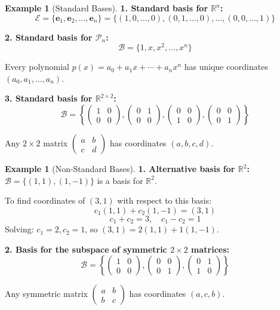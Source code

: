 \documentclass[12pt]{article}
\numberwithin{equation}{section}
\newcommand{\vect}[1]{\boldsymbol{#1}}   %
\theoremstyle{plain}
\theoremstyle{definition}
\newtheorem{example}[theorem]{Example}
\theoremstyle{remark}
\begin{document}
\begin{example}[Standard Bases]
\textbf{1. Standard basis for $\mathbb{R}^n$:}
$$\mathcal{E} = \{\vect{e}_1, \vect{e}_2, \ldots, \vect{e}_n\} = \{(1,0,\ldots,0), (0,1,\ldots,0), \ldots, (0,0,\ldots,1)\}$$

\textbf{2. Standard basis for $\mathcal{P}_n$:}
$$\mathcal{B} = \{1, x, x^2, \ldots, x^n\}$$

Every polynomial $p(x) = a_0 + a_1x + \cdots + a_nx^n$ has unique coordinates $(a_0, a_1, \ldots, a_n)$.

\textbf{3. Standard basis for $\mathbb{R}^{2 \times 2}$:}
$$\mathcal{B} = \left\{\begin{pmatrix} 1 & 0 \\ 0 & 0 \end{pmatrix}, \begin{pmatrix} 0 & 1 \\ 0 & 0 \end{pmatrix}, \begin{pmatrix} 0 & 0 \\ 1 & 0 \end{pmatrix}, \begin{pmatrix} 0 & 0 \\ 0 & 1 \end{pmatrix}\right\}$$

Any $2 \times 2$ matrix $\begin{pmatrix} a & b \\ c & d \end{pmatrix}$ has coordinates $(a, b, c, d)$.
\end{example}

\begin{example}[Non-Standard Bases]
\textbf{1. Alternative basis for $\mathbb{R}^2$:}
$\mathcal{B} = \{(1,1), (1,-1)\}$ is a basis for $\mathbb{R}^2$.

To find coordinates of $(3,1)$ with respect to this basis:
$$c_1(1,1) + c_2(1,-1) = (3,1)$$
$$c_1 + c_2 = 3, \quad c_1 - c_2 = 1$$
Solving: $c_1 = 2, c_2 = 1$, so $(3,1) = 2(1,1) + 1(1,-1)$.

\textbf{2. Basis for the subspace of symmetric $2 \times 2$ matrices:}
$$\mathcal{B} = \left\{\begin{pmatrix} 1 & 0 \\ 0 & 0 \end{pmatrix}, \begin{pmatrix} 0 & 0 \\ 0 & 1 \end{pmatrix}, \begin{pmatrix} 0 & 1 \\ 1 & 0 \end{pmatrix}\right\}$$

Any symmetric matrix $\begin{pmatrix} a & b \\ b & c \end{pmatrix}$ has coordinates $(a, c, b)$.
\end{example}
\end{document}
